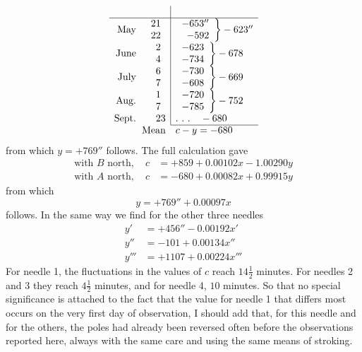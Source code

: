 \[
\begin{array}{rr|l}
&&\\\hline
\text{May}&\begin{array}{r}21\\22\end{array}&\left.\begin{array}{r}-653''\\-592\end{array}\right\}-623''\\
\text{June}&\begin{array}{r}2\\4\end{array}&\left.\begin{array}{r}-623\\-734\end{array}\right\}-678\\
\text{July}&\begin{array}{r}6\\7\end{array}&\left.\begin{array}{r}-730\\-608\end{array}\right\}-669\\
\text{Aug.}&\begin{array}{r}1\\7\end{array}&\left.\begin{array}{r}-720\\-785\end{array}\right\}-752\\
\text{Sept.}&23&.\ .\ .\quad-680\\\cline{3-3}
\multicolumn{2}{r}{\text{Mean}}&c-y=-680
\end{array}
\]
from which $y=+769''$ follows. The full calculation gave
\[
\begin{aligned}
\text{with }B\text{ north},\quad c&=+859+0.00102x-1.00290y\\
\text{with }A\text{ north},\quad c&=-680+0.00082x+0.99915y
\end{aligned}
\]
from which
\[
y=+769''+0.00097x
\]
follows. In the same way we find for the other three needles
\[
\begin{aligned}
y'&=+456''-0.00192x'\\
y''&=-101+0.00134x''\\
y'''&=+1107+0.00224x'''
\end{aligned}
\]
For needle 1, the fluctuations in the values of $c$ reach $14\frac12$ minutes. For needles 2 and 3 they reach $4\frac12$ minutes, and for needle 4, $10$ minutes. So that no special significance is attached to the fact that the value for needle 1 that differs most occurs on the very first day of observation, I should add that, for this needle and for the others, the poles had already been reversed often before the observations reported here, always with the same care and using the same means of stroking.

